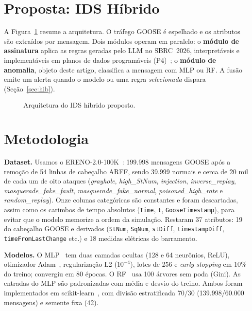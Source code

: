 \documentclass[12pt]{article}
\begin{document}
\section{Proposta: IDS Híbrido}

A Figura~\ref{fig:arq} resume a arquitetura. O tráfego GOOSE é espelhado e os
atributos são extraídos por mensagem. Dois módulos operam em paralelo: o
\textbf{módulo de assinatura} aplica as regras geradas pelo LLM no SBRC~2026,
interpretáveis e implementáveis em planos de dados programáveis
(P4)~\cite{bosshart2014p4,fida2026pdpsurvey}; o \textbf{módulo de anomalia},
objeto deste artigo, classifica a mensagem com MLP ou RF. A fusão emite um
alerta quando o modelo ou uma regra \emph{selecionada} dispara (Seção~\ref{sec:hib}).

\begin{figure}[ht]
\centering
\resizebox{\linewidth}{!}{}
\caption{Arquitetura do IDS híbrido proposto.}
\label{fig:arq}
\end{figure}

\section{Metodologia}

\textbf{Dataset.} Usamos o ERENO-2.0-100K~\cite{quincozes2024ereno}: 199.998
mensagens GOOSE após a remoção de 54 linhas de cabeçalho ARFF, sendo 39.999
normais e cerca de 20 mil de cada um de oito ataques (\textit{grayhole},
\textit{high\_StNum}, \textit{injection}, \textit{inverse\_replay},
\textit{masquerade\_fake\_fault}, \textit{masquerade\_fake\_normal},
\textit{poisoned\_high\_rate} e \textit{random\_replay}).
Onze colunas categóricas são constantes e foram descartadas, assim como os
carimbos de tempo absolutos (\texttt{Time}, \texttt{t},
\texttt{GooseTimestamp}), para evitar que o modelo memorize a ordem da
simulação. Restaram 37 atributos: 19 do cabeçalho GOOSE e derivados
(\texttt{StNum}, \texttt{SqNum}, \texttt{stDiff}, \texttt{timestampDiff},
\texttt{timeFromLastChange} etc.) e 18 medidas elétricas do barramento.

\textbf{Modelos.} O MLP~\cite{rumelhart1986learning,haykin2009neural} tem duas
camadas ocultas (128 e 64 neurônios, ReLU), otimizador
Adam~\cite{kingma2015adam}, regularização L2 ($10^{-4}$), lotes de 256 e
\textit{early stopping} em 10\% do treino; convergiu em 80 épocas. O
RF~\cite{breiman2001random} usa 100 árvores sem poda (Gini). As entradas do MLP
são padronizadas com média e desvio do treino. Ambos foram implementados em
scikit-learn~\cite{pedregosa2011scikit}, com divisão estratificada 70/30
(139.998/60.000 mensagens) e semente fixa (42).
\end{document}
